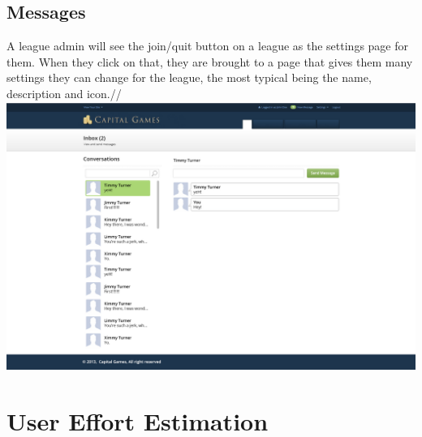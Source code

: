 \subsection{Messages}
A league admin will see the join/quit button on a league as the settings page for them. When they click on that, they are brought to a page that gives them many settings they can change for the league, the most typical being the name, description and icon.//
\includegraphics{./mockups/JPEG/messages.jpg}


\section{User Effort Estimation}